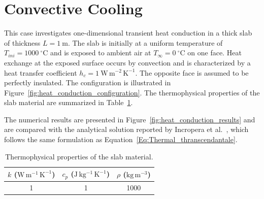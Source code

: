 \documentclass[12pt]{article}
\begin{document}
\fi

\section{Convective Cooling}

This case investigates one-dimensional transient heat conduction in a thick slab of thickness $L = 1~\mathrm{m}$. 
The slab is initially at a uniform temperature of $T_{ini} = 1000~^\circ\mathrm{C}$ and is exposed to ambient air at 
$T_\infty = 0~^\circ\mathrm{C}$ on one face. Heat exchange at the exposed surface occurs by convection and is characterized 
by a heat transfer coefficient $h_c = 1~\mathrm{W\,m^{-2}\,K^{-1}}$. 
The opposite face is assumed to be perfectly insulated. 
The configuration is illustrated in Figure~\ref{fig:heat_conduction_configuration}. 
The thermophysical properties of the slab material are summarized in Table~\ref{tab:thermal_properties_heat_conduction}.

The numerical results are presented in Figure~\ref{fig:heat_conduction_results} and are compared with the analytical solution 
reported by Incropera et al.~\cite{incropera_fundamentals_2007}, which follows the same formulation as 
Equation~\ref{Eq:Thermal_thranscendantale}.

\begin{table}[H]
\centering
\caption{Thermophysical properties of the slab material.}
\label{tab:thermal_properties_heat_conduction}
\renewcommand{\arraystretch}{1.3}
\begin{tabular}{c c c}
\hline
$k$ ($\mathrm{W\,m^{-1}\,K^{-1}}$) &
$c_p$ ($\mathrm{J\,kg^{-1}\,K^{-1}}$) &
$\rho$ ($\mathrm{kg\,m^{-3}}$) \\
\hline
1 & 1 & 1000 \\
\hline
\end{tabular}
\end{table}
\end{document}
